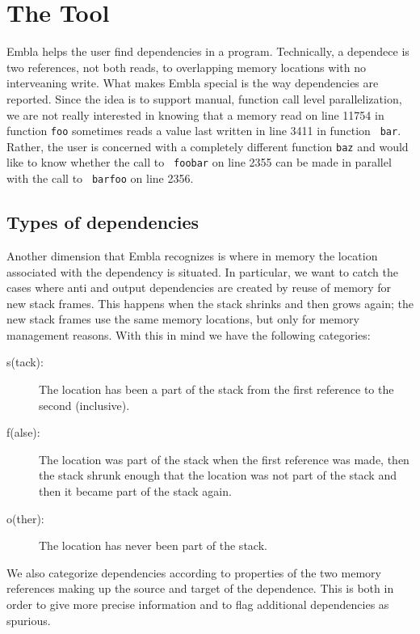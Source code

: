 \section{The Tool}

Embla helps the user find dependencies in a program. Technically, a
dependece is two references, not both reads, to overlapping memory
locations with no interveaning write. What makes Embla special is the
way dependencies are reported. Since the idea is to support manual,
function call level parallelization, we are not really interested in
knowing that a memory read on line 11754 in function {\tt foo}
sometimes reads a value last written in line 3411 in function {\tt
bar}. Rather, the user is concerned with a completely different
function {\tt baz} and would like to know whether the call to {\tt
foobar} on line 2355 can be made in parallel with the call to {\tt
barfoo} on line 2356.



\subsection{Types of dependencies}

Another dimension that Embla recognizes is where in memory the
location associated with the dependency is situated. In particular, we
want to catch the cases where anti and output dependencies are created
by reuse of memory for new stack frames. This happens when the stack 
shrinks and
then grows again; the new stack frames use the same memory locations,
but only for memory management reasons. With this in mind we have the
following categories:
\begin{description}
\item[s(tack):]
The location has been a part of the stack from the first reference to
the second (inclusive).
\item[f(alse):]
The location was part of the stack when the first reference was made,
then the stack shrunk enough that the location was not part of the
stack and then it became part of the stack again.
\item[o(ther):]
The location has never been part of the stack.
\end{description}

We also categorize dependencies according to properties of the two 
memory references making up the source and target of the dependence. 
This is both in order to give more precise information and to flag
additional dependencies as spurious. 


